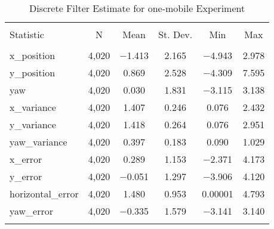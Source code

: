 
\begin{table}[h] \centering 
  \caption{Discrete Filter Estimate for one-mobile Experiment} 
  \label{tab:one_mobile_discrete_summary} 
\begin{tabular}{@{\extracolsep{5pt}}lccccc} 
\\[-1.8ex]\hline 
\hline \\[-1.8ex] 
Statistic & \multicolumn{1}{c}{N} & \multicolumn{1}{c}{Mean} & \multicolumn{1}{c}{St. Dev.} & \multicolumn{1}{c}{Min} & \multicolumn{1}{c}{Max} \\ 
\hline \\[-1.8ex] 
x\_position & 4,020 & $-$1.413 & 2.165 & $-$4.943 & 2.978 \\ 
y\_position & 4,020 & 0.869 & 2.528 & $-$4.309 & 7.595 \\ 
yaw & 4,020 & 0.030 & 1.831 & $-$3.115 & 3.138 \\ 
x\_variance & 4,020 & 1.407 & 0.246 & 0.076 & 2.432 \\ 
y\_variance & 4,020 & 1.418 & 0.264 & 0.076 & 2.951 \\ 
yaw\_variance & 4,020 & 0.397 & 0.183 & 0.090 & 1.029 \\ 
x\_error & 4,020 & 0.289 & 1.153 & $-$2.371 & 4.173 \\ 
y\_error & 4,020 & $-$0.051 & 1.297 & $-$3.906 & 4.120 \\ 
horizontal\_error & 4,020 & 1.480 & 0.953 & 0.00001 & 4.793 \\ 
yaw\_error & 4,020 & $-$0.335 & 1.579 & $-$3.141 & 3.140 \\ 
\hline \\[-1.8ex] 
\end{tabular} 
\end{table} 
